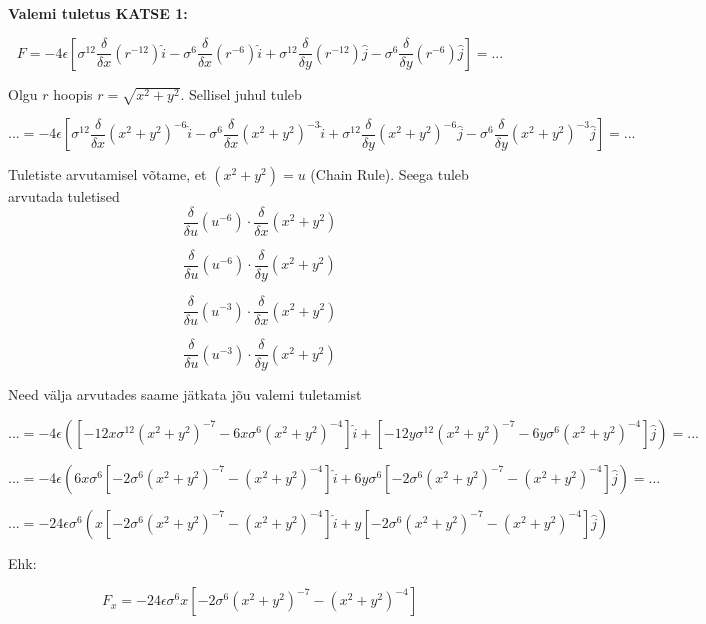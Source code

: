 \begin{flushleft}
\textbf{Valemi tuletus KATSE 1:}



\[F=-4 \epsilon \left[ \sigma^{12} \dfrac{\delta}{\delta x} \left( r^{-12} \right) \hat{i}-\sigma^{6} \dfrac{\delta}{\delta x} (r^{-6}) \hat{i}+\sigma^{12} \dfrac{\delta}{\delta y} (r^{-12}) \hat{j} -\sigma^{6} \dfrac{\delta}{\delta y} (r^{-6}) \hat{j}\right]=... \]

Olgu $r$ hoopis $ r=\sqrt{x^{2}+y^{2}} $. Sellisel juhul tuleb

\[...= -4 \epsilon \left[ \sigma^{12} \dfrac{\delta}{\delta x} (x^{2}+y^{2})^{-6} \hat{i}-\sigma^{6} \dfrac{\delta}{\delta x} (x^{2}+y^{2})^{-3} \hat{i}+\sigma^{12} \dfrac{\delta}{\delta y} (x^{2}+y^{2})^{-6} \hat{j} -\sigma^{6} \dfrac{\delta}{\delta y} (x^{2}+y^{2})^{-3} \hat{j}\right]=...\]

Tuletiste arvutamisel võtame, et $(x^{2}+y^{2})=u$ (Chain Rule). Seega tuleb arvutada tuletised 
\[\dfrac{\delta}{\delta u} (u^{-6}) \cdot \dfrac{\delta}{\delta x} (x^{2}+y^{2}) \]

\[\dfrac{\delta}{\delta u} (u^{-6}) \cdot \dfrac{\delta}{\delta y} (x^{2}+y^{2}) \]

\[\dfrac{\delta}{\delta u} (u^{-3}) \cdot \dfrac{\delta}{\delta x} (x^{2}+y^{2}) \]

\[\dfrac{\delta}{\delta u} (u^{-3}) \cdot \dfrac{\delta}{\delta y} (x^{2}+y^{2}) \]

Need välja arvutades saame jätkata jõu valemi tuletamist

\[...=-4 \epsilon \left( \left[-12x \sigma^{12}(x^{2}+y^{2})^{-7}-6x \sigma^{6}(x^{2}+y^{2})^{-4} \right] \hat{i}+ \left[-12y \sigma^{12}(x^{2}+y^{2})^{-7}-6y \sigma^{6}(x^{2}+y^{2})^{-4} \right] \hat{j} \right) =...\]

\[...=-4 \epsilon \left(6x \sigma^{6} \left[-2 \sigma^{6}(x^{2}+y^{2})^{-7}- (x^{2}+y^{2})^{-4} \right] \hat{i}+6y \sigma^{6} \left[-2 \sigma^{6}(x^{2}+y^{2})^{-7}-(x^{2}+y^{2})^{-4} \right] \hat{j} \right) =...\]


\[...=-24  \epsilon \sigma^{6} \left(x  \left[-2 \sigma^{6}(x^{2}+y^{2})^{-7}- (x^{2}+y^{2})^{-4} \right] \hat{i}+y \left[-2 \sigma^{6}(x^{2}+y^{2})^{-7}-(x^{2}+y^{2})^{-4} \right] \hat{j} \right)  \]

Ehk:

\begin{equation} \label{eq_5.5}
F_{x}=-24 \epsilon \sigma^{6} x \left[ -2 \sigma^{6}(x^{2}+y^{2})^{-7}-(x^{2}+y^{2})^{-4} \right]
\end{equation}


\end{flushleft}
